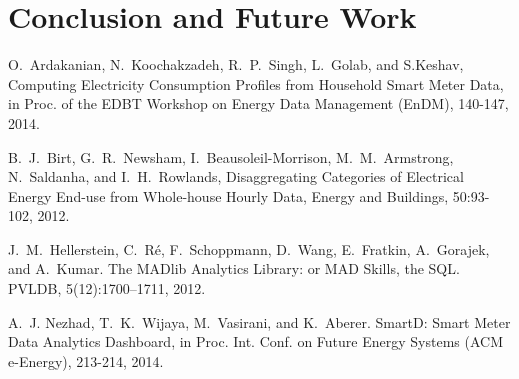 \documentclass{sig-alternate}
\begin{document}
\section{Conclusion and Future Work} 


\begin{thebibliography}{20}

O.~Ardakanian, N.~Koochakzadeh, R.~P.~Singh, L.~Golab, and S.Keshav, Computing Electricity Consumption Profiles from Household Smart Meter Data, in Proc. of the EDBT Workshop on Energy Data Management (EnDM), 140-147, 2014.

B.~J.~Birt,  G.~R.~Newsham,  I.~Beausoleil-Morrison, M.~M.~Armstrong,  N.~Saldanha, and I.~H.~Rowlands, Disaggregating Categories of Electrical Energy End-use from Whole-house Hourly Data, Energy and Buildings, 50:93-102, 2012.

 J.~M.~Hellerstein, C.~R\'{e}, F.~Schoppmann, D.~Wang, E.~Fratkin, A.~Gorajek, and A.~Kumar. The MADlib Analytics Library: or MAD Skills, the SQL. PVLDB, 5(12):1700--1711, 2012.

A.~J. Nezhad, T.~K.~Wijaya, M.~Vasirani, and K.~Aberer.  SmartD: Smart Meter Data Analytics Dashboard, in Proc. Int. Conf. on Future Energy Systems (ACM e-Energy), 213-214, 2014.


\end{thebibliography}

\end{document}

